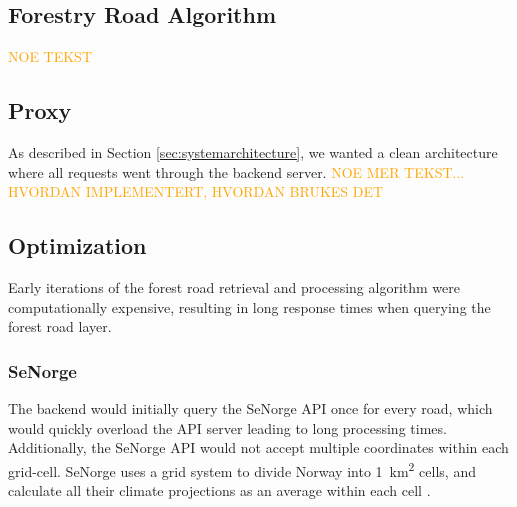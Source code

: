 \subsection{Forestry Road Algorithm}

\textcolor{orange}{NOE TEKST}

\subsection{Proxy}\label{subsec:proxy}

As described in Section \ref{sec:systemarchitecture}, we wanted a clean architecture where all requests went through the backend server. 
\textcolor{orange}{NOE MER TEKST... HVORDAN IMPLEMENTERT, HVORDAN BRUKES DET}


\subsection{Optimization}

Early iterations of the forest road retrieval and processing algorithm were computationally expensive, resulting in long response times when querying the forest road layer.

\subsubsection{SeNorge}

The backend would initially query the SeNorge API once for every road, which would quickly overload the API server leading to long processing times. Additionally, the SeNorge API would not accept multiple coordinates within each grid-cell. SeNorge uses a grid system to divide Norway into \qty{1}{\kilo\meter\squared} cells, and calculate all their climate projections as an average within each cell \cite{senorge_watermap}. 

